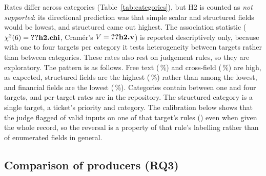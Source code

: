 \documentclass[conference]{IEEEtran}
\begin{document}
Rates differ across categories (Table~\ref{tab:categories}), but H2 is counted as \emph{not
supported}: its directional prediction was that simple scalar and structured fields would be lowest,
and structured came out highest. The association statistic ($\chi^2(6)=\R{h2.chi}$, Cram\'er's
$V=\R{h2.v}$) is reported descriptively only, because with one to four targets per category it tests
heterogeneity between targets rather than between categories.\ifjudgeweak{} These rates also rest on
judgement rules, so they are exploratory.\fi{} The pattern is as follows. Free text (\,\%) and
cross-field (\,\%) are high, as expected, structured fields are the highest
(\,\%) rather than among the lowest, and financial fields are the lowest
(\,\%). Categories contain between one and four targets, and per-target rates are in the repository. The
structured category is a single target, a ticket's priority and category. The calibration below shows
that the judge flagged  of  valid inputs on one of that target's rules
() even when given the whole record, so the reversal is a property of that rule's
labelling rather than of enumerated fields in general.

\subsection{Comparison of producers (RQ3)}
\end{document}
